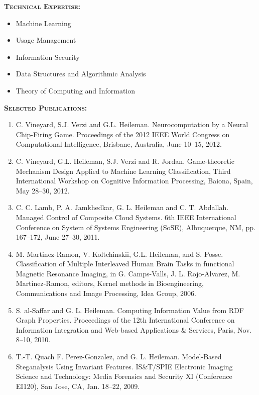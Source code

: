 \documentclass{sbir}
\begin{document}
{\vspace{-18pt}
{\textcolor{black}{\makebox[6.5in]{\hrulefill}} 
\textbf{\textsc{Technical Expertise:}}
\vspace{-8pt}
\begin{multicols}{2}
 \begin{itemize}
  \item Machine Learning
  \item Usage Management
  \item Information Security
  \item Data Structures and Algorithmic Analysis
  \item Theory of Computing and Information	
 \end{itemize}
\end{multicols}
\vspace{-12pt}
\textbf{\textsc{Selected Publications:}}
\vspace{-8pt}
\begin{enumerate}
\item C. Vineyard, S.J. Verzi and G.L. Heileman.  Neurocomputation by a Neural Chip-Firing Game. Proceedings of the 2012 IEEE World Congress on Computational Intelligence, Brisbane, Australia, June 10--15, 2012.
\item C. Vineyard, G.L. Heileman, S.J. Verzi and R. Jordan.  Game-theoretic Mechanism Design Applied to Machine Learning Classification, Third International Workshop on Cognitive Information Processing, Baiona, Spain, May 28--30, 2012.
\item C. C. Lamb, P. A. Jamkhedkar, G. L. Heileman and C. T. Abdallah. Managed Control of Composite Cloud Systems. 6th IEEE International Conference on System of Systems Engineering (SoSE), Albuquerque, NM, pp. 167--172, June 27--30, 2011.
\item M. Martinez-Ramon, V. Koltchinskii, G.L. Heileman, and S. Posse. Classification of Multiple Interleaved Human Brain Tasks in functional Magnetic Resonance Imaging, in G. Camps-Valls, J. L. Rojo-Alvarez, M. Martinez-Ramon, editors, Kernel methods in Bioengineering, Communications and Image Processing, Idea Group, 2006.
\item S. al-Saffar and G. L. Heileman. Computing Information Value from RDF Graph Properties. Proceedings of the 12th International Conference on Information Integration and Web-based Applications \& Services, Paris, Nov. 8--10, 2010.
\item T.-T. Quach F. Perez-Gonzalez, and G. L. Heileman. Model-Based Steganalysis Using Invariant Features. IS\&T/SPIE Electronic Imaging Science and Technology: Media Forensics and Security XI (Conference EI120), San Jose, CA, Jan. 18--22, 2009.

\end{enumerate}}}
\end{document}
